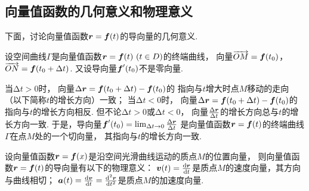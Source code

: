 \subsection{向量值函数的几何意义和物理意义}
下面，讨论向量值函数\(\boldsymbol{r}=\boldsymbol{f}(t)\)的导向量的几何意义.

设空间曲线\(\Gamma\)是向量值函数\(\boldsymbol{r}=\boldsymbol{f}(t)\ (t \in D)\)的终端曲线，
向量\(\overrightarrow{OM}=\boldsymbol{f}(t_0)\)，\(\overrightarrow{ON}=\boldsymbol{f}(t_0+\Delta t)\).
又设导向量\(\boldsymbol{f}'(t_0)\)不是零向量.

当\(\increment t>0\)时，
向量\(\Delta\boldsymbol{r}=\boldsymbol{f}(t_0+\Delta t)-\boldsymbol{f}(t_0)\)的
指向与\(t\)增大时点\(M\)移动的走向（以下简称\(t\)的增长方向）一致；
当\(\increment t<0\)时，
向量\(\Delta\boldsymbol{r}=\boldsymbol{f}(t_0+\Delta t)-\boldsymbol{f}(t_0)\)的
指向与\(t\)的增长方向相反.
但不论\(\increment t>0\)或\(\increment t<0\)，
向量\(\frac{\Delta\boldsymbol{r}}{\Delta t}\)的增长方向总与\(t\)的增长方向一致.
于是，导向量\(\boldsymbol{f}'(t_0)=\lim_{\Delta t\to0} \frac{\Delta\boldsymbol{r}}{\Delta t}\)
是向量值函数\(\boldsymbol{r}=\boldsymbol{f}(t)\)的终端曲线\(\Gamma\)在点\(M\)处的一个切向量，
其指向与\(t\)的增长方向一致.

设向量值函数\(\boldsymbol{r}=\boldsymbol{f}(x)\)是沿空间光滑曲线运动的质点\(M\)的位置向量，
则向量值函数\(\boldsymbol{r}=\boldsymbol{f}(t)\)的导向量有以下的物理意义：
\(\boldsymbol{v}(t)=\dv{\boldsymbol{r}}{t}\)是质点\(M\)的速度向量，其方向与曲线相切；
\(\boldsymbol{a}(t)=\dv{\boldsymbol{v}}{t}=\dv[2]{\boldsymbol{r}}{t}\)是质点\(M\)的加速度向量.
